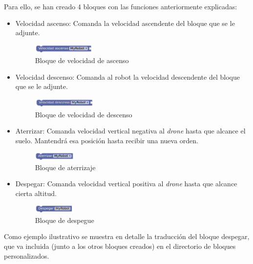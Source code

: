 Para ello, se han creado 4 bloques con las funciones anteriormente explicadas: 
\begin{itemize}
    \item Velocidad ascenso: Comanda la velocidad ascendente del bloque que se le adjunte. 
    \begin{figure}[H]
        \centering
        \includegraphics[width=0.3\textwidth]{img/ascensionBlockly.png}
        \caption{Bloque de velocidad de ascenso} \label{fig:ascension}
    \end{figure}
    
    \item Velocidad descenso: Comanda al robot la velocidad descendente del bloque que se le adjunte. 
    \begin{figure}[H]
        \centering
        \includegraphics[width=0.3\textwidth]{img/descensoBlockly.png}
        \caption{Bloque de velocidad de descenso} \label{fig:descenso}
    \end{figure}
    \item Aterrizar: Comanda velocidad vertical negativa al \textit{drone} hasta que alcance el suelo. Mantendrá esa posición hasta recibir una nueva orden.
    \begin{figure}[H]
        \centering
        \includegraphics[width=0.2\textwidth]{img/aterrizarBlockly.png}
        \caption{Bloque de aterrizaje} \label{fig:aterrizaje}
    \end{figure}
    \item Despegar: Comanda velocidad vertical positiva al \textit{drone} hasta que alcance cierta altitud. 
        \begin{figure}[H]
            \centering
            \includegraphics[width=0.2\textwidth]{img/despegarBlockly.png}
            \caption{Bloque de despegue} \label{fig:despegar}
        \end{figure}
\end{itemize}

 Como ejemplo ilustrativo se muestra en detalle la traducción del bloque despegar, que va incluida (junto a los otros bloques creados) en el directorio de bloques personalizados.


